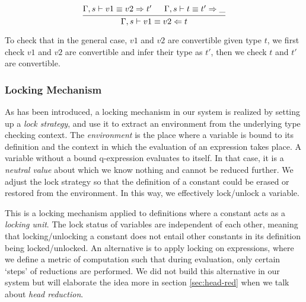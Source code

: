 \documentclass{article}
\theoremstyle{remark}
\begin{document}
\begin{align}
  \begin{prooftree}
    \hypo{\Gamma,s \vdash v1 \equiv v2 \Rightarrow t'}
    \hypo{\Gamma,s \vdash t \equiv t' \Rightarrow \_}
    \infer2{\Gamma,s \vdash v1 \equiv v2 \Leftarrow t} 
  \end{prooftree}
\end{align}

To check that in the general case, $v1$ and $v2$ are convertible given type $t$, we first check $v1$ and $v2$ are convertible and infer their type as $t'$, then we check $t$ and $t'$ are convertible.

\subsubsection{Locking Mechanism}
As has been introduced, a locking mechanism in our system is realized by setting up a \emph{lock strategy}, and use it to extract an environment from the underlying type checking context. The \emph{environment} is the place where a variable is bound to its definition and the context in which the evaluation of an expression takes place. A variable without a bound q-expression evaluates to itself. In that case, it is a \emph{neutral value} about which we know nothing and cannot be reduced further. We adjust the lock strategy so that the definition of a constant could be erased or restored from the environment. In this way, we effectively lock/unlock a variable.

This is a locking mechanism applied to definitions where a constant acts as a \emph{locking unit}. The lock status of variables are independent of each other, meaning that locking/unlocking a constant does not entail other constants in its definition being locked/unlocked. An alternative is to apply locking on expressions, where we define a metric of computation such that during evaluation, only certain `steps' of reductions are performed. We did not build this alternative in our system but will elaborate the idea more in section \ref{sec:head-red} when we talk about \emph{head reduction}.
\end{document}
